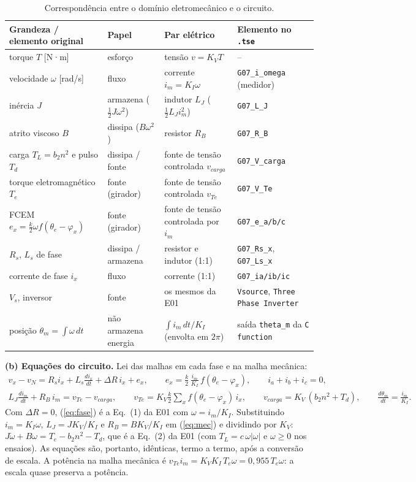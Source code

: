 \documentclass[10pt,a4paper]{article}
\begin{document}
\begin{table}[!htbp]\centering\small
\caption{Correspondência entre o domínio eletromecânico e o circuito.}\label{tab:analog}
\begin{tabularx}{\textwidth}{p{3.6cm}p{2.6cm}p{4.2cm}Y}\toprule
Grandeza / elemento original & Papel & Par elétrico & Elemento no \texttt{.tse}\\\midrule
torque $T$ [N·m] & esforço & tensão $v=K_V T$ & --\\
velocidade $\omega$ [rad/s] & fluxo & corrente $i_m=K_I\omega$ & \texttt{G07\_i\_omega} (medidor)\\
inércia $J$ & armazena ($\tfrac12J\omega^2$) & indutor $L_J$ ($\tfrac12L_Ji_m^2$) & \texttt{G07\_L\_J}\\
atrito viscoso $B$ & dissipa ($B\omega^2$) & resistor $R_B$ & \texttt{G07\_R\_B}\\
carga $T_L=b_2n^2$ e pulso $T_d$ & dissipa / fonte & fonte de tensão controlada $v_{carga}$ & \texttt{G07\_V\_carga}\\
torque eletromagnético $T_e$ & fonte (girador) & fonte de tensão controlada $v_{Te}$ & \texttt{G07\_V\_Te}\\
FCEM $e_x=\tfrac k2\omega f(\theta_e-\varphi_x)$ & fonte (girador) & fonte de tensão controlada por $i_m$ & \texttt{G07\_e\_a/b/c}\\
$R_s$, $L_s$ de fase & dissipa / armazena & resistor e indutor (1:1) & \texttt{G07\_Rs\_x}, \texttt{G07\_Ls\_x}\\
corrente de fase $i_x$ & fluxo & corrente (1:1) & \texttt{G07\_ia/ib/ic}\\
$V_s$, inversor & fonte & os mesmos da E01 & \texttt{Vsource}, \texttt{Three Phase Inverter}\\
posição $\theta_m=\int\omega\,dt$ & não armazena energia & $\int i_m\,dt/K_I$ (envolta em $2\pi$) & saída \texttt{theta\_m} da \texttt{C function}\\\bottomrule
\end{tabularx}
\end{table}

\textbf{(b) Equações do circuito.} Lei das malhas em cada fase e na malha mecânica:
\begin{gather}
v_x-v_N=R_s i_x+L_s\frac{di_x}{dt}+\Delta R\,i_x+e_x,\qquad e_x=\frac k2\,\frac{i_m}{K_I}\,f(\theta_e-\varphi_x),\qquad i_a+i_b+i_c=0, \label{eq:fase}\\
L_J\frac{di_m}{dt}+R_B\,i_m=v_{Te}-v_{carga},\qquad v_{Te}=K_V\frac k2\sum_x f(\theta_e-\varphi_x)\,i_x,\qquad v_{carga}=K_V\,(b_2n^2+T_d),\qquad \frac{d\theta_m}{dt}=\frac{i_m}{K_I}. \label{eq:mec}
\end{gather}
Com $\Delta R=0$, (\ref{eq:fase}) é a Eq.~(1) da E01 com $\omega=i_m/K_I$. Substituindo $i_m=K_I\omega$, $L_J=JK_V/K_I$ e $R_B=BK_V/K_I$ em (\ref{eq:mec}) e dividindo por $K_V$: $J\dot\omega+B\omega=T_e-b_2n^2-T_d$, que é a Eq.~(2) da E01 (com $T_L=c\,\omega|\omega|$ e $\omega\ge0$ nos ensaios). As equações são, portanto, idênticas, termo a termo, após a conversão de escala. A potência na malha mecânica é $v_{Te}i_m=K_VK_I\,T_e\omega=0{,}955\,T_e\omega$: a escala quase preserva a potência.
\end{document}
